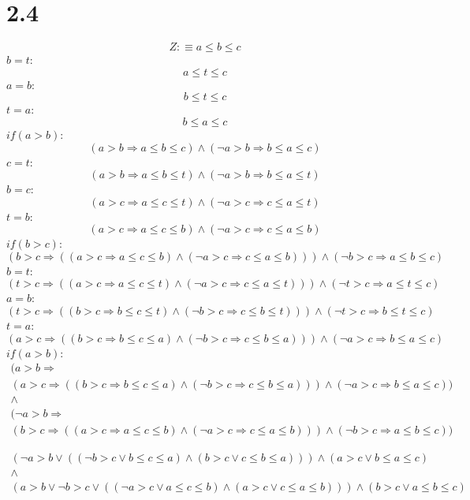 \documentclass{article}
\begin{document}
\section*{2.4}

$$ Z:\equiv a \le b \le c $$
$b=t$:
$$ a \le t \le c $$
$a=b$:
$$ b \le t \le c $$
$t=a$:
$$ b \le a \le c $$
$if(a>b)$:
$$ (a>b \Rightarrow a \le b \le c) \land (\neg a>b \Rightarrow b \le a \le c) $$
$c=t$:
$$ (a>b \Rightarrow a \le b \le t) \land (\neg a>b \Rightarrow b \le a \le t) $$
$b=c$:
$$ (a>c \Rightarrow a \le c \le t) \land (\neg a>c \Rightarrow c \le a \le t) $$
$t=b$:
$$ (a>c \Rightarrow a \le c \le b) \land (\neg a>c \Rightarrow c \le a \le b) $$
$if(b>c)$:
$$ (b>c \Rightarrow ((a>c \Rightarrow a \le c \le b) \land (\neg a>c \Rightarrow c \le a \le b))) \land (\neg b>c \Rightarrow a \le b \le c) $$
$b=t$:
$$ (t>c \Rightarrow ((a>c \Rightarrow a \le c \le t) \land (\neg a>c \Rightarrow c \le a \le t))) \land (\neg t>c \Rightarrow a \le t \le c) $$
$a=b$:
$$ (t>c \Rightarrow ((b>c \Rightarrow b \le c \le t) \land (\neg b>c \Rightarrow c \le b \le t))) \land (\neg t>c \Rightarrow b \le t \le c) $$
$t=a$:
$$ (a>c \Rightarrow ((b>c \Rightarrow b \le c \le a) \land (\neg b>c \Rightarrow c \le b \le a))) \land (\neg a>c \Rightarrow b \le a \le c) $$
$if(a>b)$:
\begin{equation}
	\begin{array}{l}
	(a>b \Rightarrow \\
	(a>c \Rightarrow ((b>c \Rightarrow b \le c \le a) \land (\neg b>c \Rightarrow c \le b \le a))) \land (\neg a>c \Rightarrow b \le a \le c)) \\
	\land \\
	(\neg a>b \Rightarrow \\
	(b>c \Rightarrow ((a>c \Rightarrow a \le c \le b) \land (\neg a>c \Rightarrow c \le a \le b))) \land (\neg b>c \Rightarrow a \le b \le c))
	\end{array}
\end{equation}

\begin{equation}
	\begin{array}{l}
	(\neg a>b \lor ((\neg b>c \lor b\le c \le a) \land (b>c \lor c \le b \le a))) \land (a>c \lor b \le a \le c) \\
	\land \\
	(a>b \lor \neg b>c \lor ((\neg a>c \lor a \le c \le b) \land (a>c \lor c \le a \le b))) \land (b>c \lor a \le b \le c)
	\end{array}
\end{equation}
\end{document}
